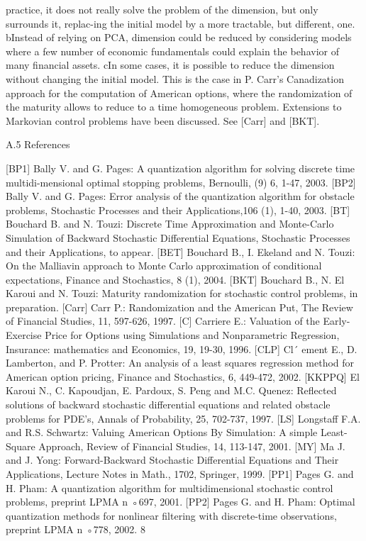\documentclass[11pt]{article}
\begin{document}
practice, it does not really solve the problem of the dimension, but only surrounds it, replac-ing the initial model by a more tractable, but different, one. bInstead of relying on PCA, dimension could be reduced by considering models where a few number of economic fundamentals could explain the behavior of many financial assets. cIn some cases, it is possible to reduce the dimension without changing the initial model. This is the case in P. Carr's Canadization approach for the computation of American options, where the randomization of the maturity allows to reduce to a time homogeneous problem. Extensions to Markovian control problems have been discussed. See [Carr] and [BKT].

A.5 References

[BP1] Bally V. and G. Pages: A quantization algorithm for solving discrete time multidi-mensional optimal stopping problems, Bernoulli, (9) 6, 1-47, 2003. [BP2] Bally V. and G. Pages: Error analysis of the quantization algorithm for obstacle problems, Stochastic Processes and their Applications,106 (1), 1-40, 2003. [BT] Bouchard B. and N. Touzi: Discrete Time Approximation and Monte-Carlo Simulation of Backward Stochastic Differential Equations, Stochastic Processes and their Applications, to appear. [BET] Bouchard B., I. Ekeland and N. Touzi: On the Malliavin approach to Monte Carlo approximation of conditional expectations, Finance and Stochastics, 8 (1), 2004. [BKT] Bouchard B., N. El Karoui and N. Touzi: Maturity randomization for stochastic control problems, in preparation. [Carr] Carr P.: Randomization and the American Put, The Review of Financial Studies, 11, 597-626, 1997. [C] Carriere E.: Valuation of the Early-Exercise Price for Options using Simulations and Nonparametric Regression, Insurance: mathematics and Economics, 19, 19-30, 1996. [CLP] Cl´ ement E., D. Lamberton, and P. Protter: An analysis of a least squares regression method for American option pricing, Finance and Stochastics, 6, 449-472, 2002. [KKPPQ] El Karoui N., C. Kapoudjan, E. Pardoux, S. Peng and M.C. Quenez: Reflected solutions of backward stochastic differential equations and related obstacle problems for PDE's, Annals of Probability, 25, 702-737, 1997. [LS] Longstaff F.A. and R.S. Schwartz: Valuing American Options By Simulation: A simple Least-Square Approach, Review of Financial Studies, 14, 113-147, 2001. [MY] Ma J. and J. Yong: Forward-Backward Stochastic Differential Equations and Their Applications, Lecture Notes in Math., 1702, Springer, 1999. [PP1] Pages G. and H. Pham: A quantization algorithm for multidimensional stochastic control problems, preprint LPMA n ◦697, 2001. [PP2] Pages G. and H. Pham: Optimal quantization methods for nonlinear filtering with discrete-time observations, preprint LPMA n ◦778, 2002. 8
\end{document}
